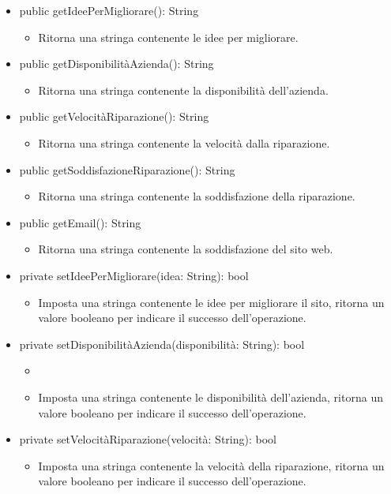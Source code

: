 \documentclass{report}
\begin{document}
\begin{itemize}
\item public getIdeePerMigliorare(): String
\begin{itemize}
	\item Ritorna una stringa contenente le idee per migliorare.
\end{itemize}
\item public getDisponibilitàAzienda(): String
\begin{itemize}
	\item Ritorna una stringa contenente la disponibilità dell'azienda.
\end{itemize}
\item public getVelocitàRiparazione(): String
\begin{itemize}
	\item Ritorna una stringa contenente la velocità dalla riparazione.
\end{itemize}
\item public getSoddisfazioneRiparazione(): String
\begin{itemize}
	\item Ritorna una stringa contenente la soddisfazione della riparazione.
\end{itemize}
\item public getEmail(): String
\begin{itemize}
	\item Ritorna una stringa contenente la soddisfazione del sito web.
\end{itemize}
\item private setIdeePerMigliorare(idea: String): bool
\begin{itemize}
	\item Imposta una stringa contenente le idee per migliorare il sito, ritorna un valore booleano per indicare il successo dell'operazione.
\end{itemize}
\item private setDisponibilitàAzienda(disponibilità: String): bool
\begin{itemize}
	\item \item Imposta una stringa contenente le disponibilità dell'azienda, ritorna un valore booleano per indicare il successo dell'operazione.
\end{itemize}
\item private setVelocitàRiparazione(velocità: String): bool
\begin{itemize}
	\item Imposta una stringa contenente la velocità della riparazione, ritorna un valore booleano per indicare il successo dell'operazione.

\end{itemize}
\end{itemize}
\end{document}
